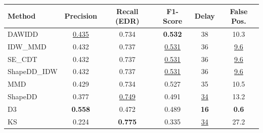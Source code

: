 \begin{tabular}{|l|c|c|c|c|c|}
\hline
\textbf{Method} & \textbf{Precision} & \textbf{Recall (EDR)} & \textbf{F1-Score} & \textbf{Delay} & \textbf{False Pos.} \\
\hline
DAWIDD & \underline{0.435} & 0.734 & \textbf{0.532} & 38 & 10.3 \\
IDW\_MMD & 0.432 & 0.737 & \underline{0.531} & 36 & \underline{9.6} \\
SE\_CDT & 0.432 & 0.737 & \underline{0.531} & 36 & \underline{9.6} \\
ShapeDD\_IDW & 0.432 & 0.737 & \underline{0.531} & 36 & \underline{9.6} \\
MMD & 0.429 & 0.734 & 0.527 & 35 & 10.5 \\
ShapeDD & 0.377 & \underline{0.749} & 0.491 & \underline{34} & 13.2 \\
D3 & \textbf{0.558} & 0.472 & 0.489 & \textbf{16} & \textbf{0.6} \\
KS & 0.224 & \textbf{0.775} & 0.335 & \underline{34} & 27.2 \\
\hline
\end{tabular}